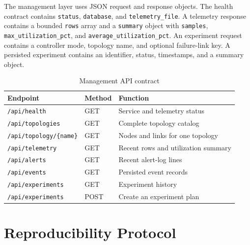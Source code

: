 \documentclass[conference]{IEEEtran}
\begin{document}
The management layer uses JSON request and response objects. The health
contract contains \texttt{status}, \texttt{database}, and
\texttt{telemetry\_file}. A telemetry response contains a bounded \texttt{rows}
array and a \texttt{summary} object with \texttt{samples},
\texttt{max\_utilization\_pct}, and \texttt{average\_utilization\_pct}.
An experiment request contains a controller mode, topology name, and optional
failure-link key. A persisted experiment contains an identifier, status,
timestamps, and a summary object.

\begin{table}[t]
\centering
\caption{Management API contract}
\label{tab:api}
\begin{tabular}{p{}p{}p{}}
\toprule
Endpoint & Method & Function\\
\midrule
\texttt{/api/health} & GET & Service and telemetry status\\
\texttt{/api/topologies} & GET & Complete topology catalog\\
\texttt{/api/topology/\{name\}} & GET & Nodes and links for one topology\\
\texttt{/api/telemetry} & GET & Recent rows and utilization summary\\
\texttt{/api/alerts} & GET & Recent alert-log lines\\
\texttt{/api/events} & GET & Persisted event records\\
\texttt{/api/experiments} & GET & Experiment history\\
\texttt{/api/experiments} & POST & Create an experiment plan\\
\bottomrule
\end{tabular}
\end{table}

\section{Reproducibility Protocol}
\label{app:reproducibility}
\end{document}
